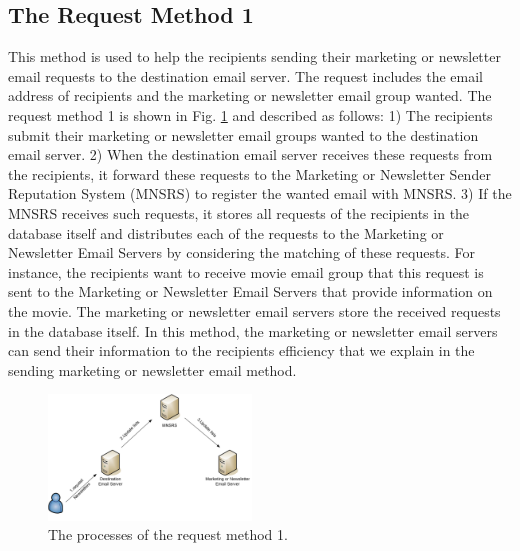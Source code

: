 \documentclass[conference]{IEEEtran}
\begin{document}
\subsection{The Request Method 1}
This method is used to help the recipients sending their marketing or newsletter email requests to the destination email server.
The request includes the email address of recipients and the marketing or newsletter email group wanted.
The request method 1 is
shown in Fig. \ref{fig:Method1} and described as follows:
1) The recipients submit their marketing or newsletter email groups wanted to the destination email server. 
2) When the destination email server receives these requests from the recipients, it forward these requests to the Marketing or Newsletter Sender Reputation System (MNSRS) to register the wanted email with MNSRS. 
3) If the MNSRS receives such requests, it stores all requests of the recipients in the database itself and distributes each of the requests to the Marketing or Newsletter Email Servers by considering the matching of these requests.
For instance, the recipients want to receive movie email group that this request is sent to the Marketing or Newsletter Email Servers that provide information on the movie.
The marketing or newsletter email servers store the received requests in the database itself.
In this method, the marketing or newsletter email servers can send their information to the recipients efficiency that we explain in the sending marketing or newsletter email method.

\begin{figure}
\centering
\includegraphics[width=0.48\textwidth]{2.pdf}
\caption{The processes of the request method 1.}
\label{fig:Method1}
\end{figure}
\end{document}
